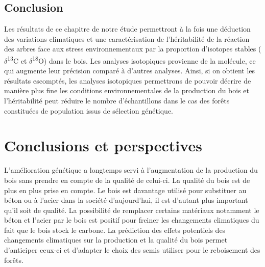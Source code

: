 \documentclass{report}
\newcommand{\Ctreize}{$\delta$\textsuperscript{13}C\xspace}
\newcommand{\Odixhuit}{$\delta$\textsuperscript{18}O\xspace}
\begin{document}
\section*{Conclusion}

Les résultats de ce chapitre de notre étude permettront à la fois une déduction des variations climatiques et une caractérisation de l'héritabilité de la réaction des arbres face aux stress environnementaux par la proportion d'isotopes stables (\Ctreize et \Odixhuit) dans le bois. Les analyses isotopiques provienne de la molécule, ce qui augmente leur précision comparé à d'autres analyses. Ainsi, si on obtient les résultats escomptés, les analyses isotopiques permettrons de pouvoir décrire de manière plus fine les conditions environnementales de la production du bois et l'héritabilité peut réduire le nombre d'échantillons dans le cas des forêts constituées de population issus de sélection génétique. 

\clearpage %

\chapter*{Conclusions et perspectives}

L'amélioration génétique a longtemps servi à l'augmentation de la production du bois sans prendre en compte de la qualité de celui-ci. La qualité du bois est de plus en plus prise en compte. Le bois est davantage utilisé pour substituer au  béton ou à l'acier dans la société d'aujourd'hui, il est d'autant plus important qu'il soit de qualité. La possibilité de remplacer certains matériaux notamment le béton et l'acier par le bois est positif pour freiner les changements climatiques du fait que le bois stock le carbone. La prédiction des effets potentiels des changements climatiques sur la production et la qualité du bois permet d'anticiper ceux-ci et d'adapter le choix des semis utiliser pour le reboisement des forêts. \\
\end{document}

